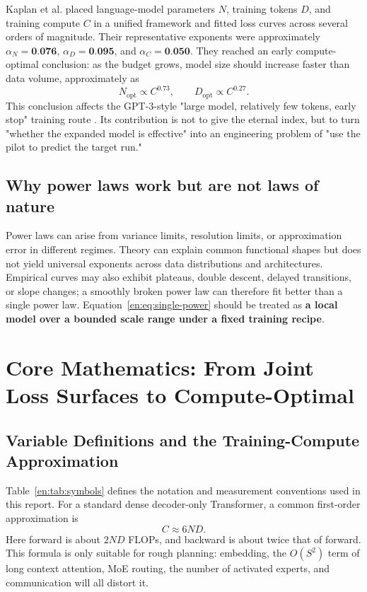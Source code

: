 \documentclass[UTF8,10pt,a4paper,fontset=none]{ctexart}
\newcommand{\term}[1]{\textbf{#1}}
\begin{document}
Kaplan et al. placed language-model parameters $N$, training tokens $D$, and training compute $C$ in a unified framework and fitted loss curves across several orders of magnitude\cite{en:kaplan2020}. Their representative exponents were approximately $\alpha_N=\textbf{0.076}$, $\alpha_D=\textbf{0.095}$, and $\alpha_C=\textbf{0.050}$. They reached an early compute-optimal conclusion: as the budget grows, model size should increase faster than data volume, approximately as
\begin{equation}
  N_{\mathrm{opt}}\propto C^{0.73},\qquad
  D_{\mathrm{opt}}\propto C^{0.27}.
  \label{en:eq:kaplan-opt}
\end{equation}
This conclusion affects the GPT-3-style "large model, relatively few tokens, early stop" training route \cite{en:brown2020}. Its contribution is not to give the eternal index, but to turn "whether the expanded model is effective" into an engineering problem of "use the pilot to predict the target run."

\subsection{Why power laws work but are not laws of nature}

Power laws can arise from variance limits, resolution limits, or approximation error in different regimes. Theory can explain common functional shapes but does not yield universal exponents across data distributions and architectures\cite{en:bahri2021}. Empirical curves may also exhibit plateaus, double descent, delayed transitions, or slope changes; a smoothly broken power law can therefore fit better than a single power law\cite{en:caballero2022}. Equation~\eqref{en:eq:single-power} should be treated as \term{a local model over a bounded scale range under a fixed training recipe}.

\section{Core Mathematics: From Joint Loss Surfaces to Compute-Optimal}

\subsection{Variable Definitions and the Training-Compute Approximation}

Table~\ref{en:tab:symbols} defines the notation and measurement conventions used in this report. For a standard dense decoder-only Transformer, a common first-order approximation is
\begin{equation}
  C\approx 6ND.
  \label{en:eq:compute}
\end{equation}
Here forward is about $2ND$ FLOPs, and backward is about twice that of forward. This formula is only suitable for rough planning: embedding, the $O(S^2)$ term of long context attention, MoE routing, the number of activated experts, and communication will all distort it.
\end{document}
